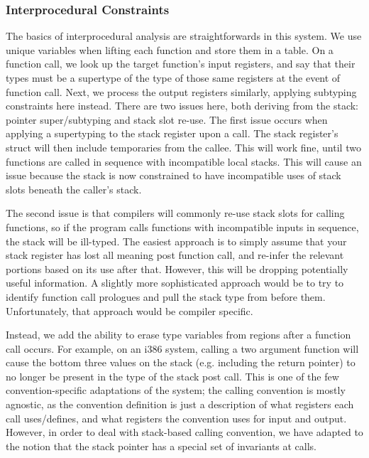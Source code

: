\subsubsection{Interprocedural Constraints}
The basics of interprocedural analysis are straightforwards in this system. We use unique variables when lifting each function and store them in a table. On a function call, we look up the target function's input registers, and say that their types must be a supertype of the type of those same registers at the event of function call. Next, we process the output registers similarly, applying subtyping constraints here instead. There are two issues here, both deriving from the stack: pointer super/subtyping and stack slot re-use. The first issue occurs when applying a supertyping to the stack register upon a call. The stack register's struct will then include temporaries from the callee. This will work fine, until two functions are called in sequence with incompatible local stacks. This will cause an issue because the stack is now constrained to have incompatible uses of stack slots beneath the caller's stack.

The second issue is that compilers will commonly re-use stack slots for calling functions, so if the program calls functions with incompatible inputs in sequence, the stack will be ill-typed. The easiest approach is to simply assume that your stack register has lost all meaning post function call, and re-infer the relevant portions based on its use after that. However, this will be dropping potentially useful information. A slightly more sophisticated approach would be to try to identify function call prologues and pull the stack type from before them. Unfortunately, that approach would be compiler specific.

Instead, we add the ability to erase type variables from regions after a function call occurs. For example, on an i386 system, calling a two argument function will cause the bottom three values on the stack (e.g. including the return pointer) to no longer be present in the type of the stack post call. This is one of the few convention-specific adaptations of the system; the calling convention is mostly agnostic, as the convention definition is just a description of what registers each call uses/defines, and what registers the convention uses for input and output. However, in order to deal with stack-based calling convention, we have adapted to the notion that the stack pointer has a special set of invariants at calls.

